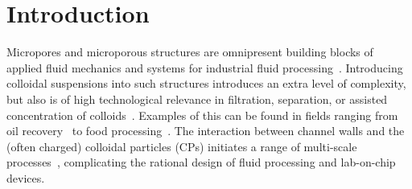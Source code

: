 \documentclass[twoside,twocolumn,9pt]{article}
\begin{document}
\renewcommand*\rmdefault{bch}\normalfont\upshape
\rmfamily
\section*{Introduction}







Micropores and microporous structures are omnipresent building blocks of applied fluid mechanics and systems for industrial fluid processing~\cite{CHOWDHURY2019265}. 
Introducing colloidal suspensions into such structures introduces an extra level of complexity, but also is of high technological relevance in filtration, separation, or assisted concentration of colloids~\cite{driscollLeveragingCollectiveEffects2019}. 
Examples of this can be found in fields ranging from oil recovery~\cite{akbariGrowthAttachmentFacilitatedEntry2016} to food processing~\cite{nathRevisitingRecentApplications2018}. 
The interaction between channel walls and the (often charged) colloidal particles (CPs) initiates a range of multi-scale processes~\cite{sparreboomPrinciplesApplicationsNanofluidic2009}, complicating the rational design of fluid processing and lab-on-chip devices. 
\end{document}
